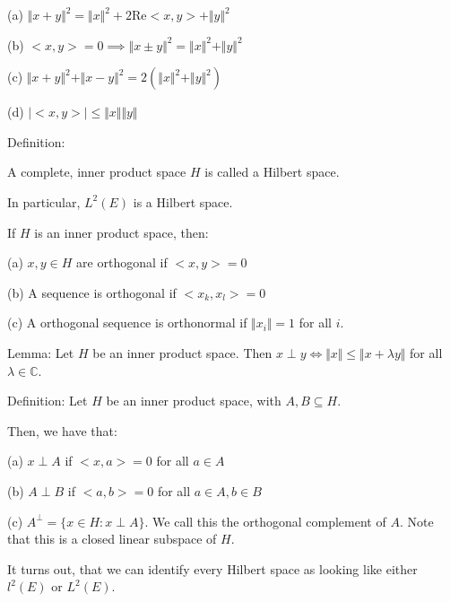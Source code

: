 \documentclass[10pt]{article}
\begin{document}
(a) $\Vert x+ y\Vert^2 = \Vert x \Vert^2 + 2 \text{Re}<x,y> + \Vert y \Vert^2 $

(b) $<x,y> = 0 \implies \Vert x \pm y \Vert^2 = \Vert x \Vert^2 + \Vert y \Vert^2$

(c)  $\Vert x + y \Vert^2  + \Vert x - y \Vert^2 = 2 (\Vert x \Vert^2 + \Vert y \Vert^2)$

(d) $| <x,y> | \leq \Vert x \Vert \Vert y \Vert $

Definition:

A complete, inner product space $H$ is called a Hilbert space.

In particular, $L^2(E)$ is a Hilbert space.

If $H$ is an inner product space, then:

(a) $x,y \in H$ are orthogonal if $<x,y> = 0$

(b) A sequence is orthogonal if $<x_k,x_l> = 0$ 

(c) A orthogonal sequence is orthonormal if $\Vert x_i \Vert = 1$ for all $i$.

Lemma: Let $H$ be an inner product space. Then $x \perp y \iff \Vert x \Vert \leq \Vert x + \lambda y \Vert$ for all $\lambda \in \mathbb{C}$.

Definition: Let $H$ be an inner product space, with $A,B \subseteq H$.

Then, we have that:

(a) $x \perp A$ if $<x,a> = 0$ for all $ a \in A$

(b) $A \perp B$ if $<a,b> = 0$ for all $a \in A, b \in B$

(c) $A^\perp = \{ x \in H : x \perp  A \}$. We call this the orthogonal complement of $A$. Note that this is a closed linear subspace of $H$.

It turns out, that we can identify every Hilbert space as looking like either $l^2(E)$ or $L^2(E)$.
\end{document}

